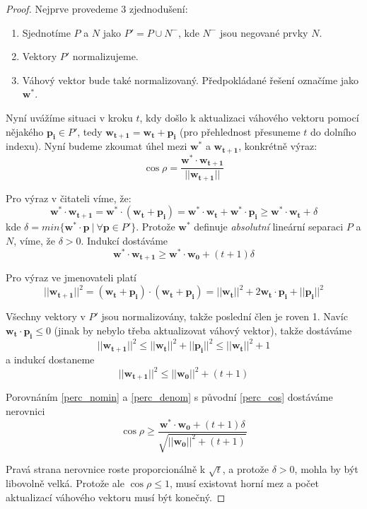 \documentclass[11pt]{report} %
\renewcommand{\vec}[1]{\mathbf{#1}}
\numberwithin{equation}{section}
\begin{document}
\begin{proof}
Nejprve provedeme 3 zjednodušení:
\begin{enumerate}
	
	
	\item Sjednotíme $P$ a $N$ jako $P' = P \cup N^-$, kde $N^-$ jsou negované prvky $N$.
	\item Vektory $P'$ normalizujeme.
	\item Váhový vektor bude také normalizovaný. Předpokládané řešení označíme jako $\vec{w^*}$.
\end{enumerate}

Nyní uvážíme situaci v kroku $t$, kdy došlo k aktualizaci váhového vektoru pomocí nějakého $\vec{p_i} \in P'$, tedy $\vec{w_{t+1}} = \vec{w_t} + \vec{p_i}$ (pro přehlednost přesuneme $t$ do dolního indexu). Nyní budeme zkoumat úhel mezi $\vec{w^*}$ a $\vec{w_{t+1}}$, konkrétně výraz:
\begin{equation}
\label{perc_cos}
\cos{\rho} = \frac{\vec{w^*} \cdot \vec{w_{t+1}}}{||\vec{w_{t+1}}||}
\end{equation}

Pro výraz v čitateli víme, že:
$$\vec{w^*}\cdot\vec{w_{t+1}} = \vec{w^*}\cdot(\vec{w_{t}} + \vec{p_i}) = \vec{w^*}\cdot\vec{w_{t}} + \vec{w^*}\cdot\vec{p_i} \geq \vec{w^*}\cdot\vec{w_{t}} + \delta$$ 
kde $\delta = min\{\vec{w^*}\cdot\vec{p}\ |\ \forall\vec{p} \in P'\}$. Protože $\vec{w^*}$ definuje \textit{absolutní} lineární separaci $P$ a $N$, víme, že $\delta > 0$. Indukcí dostáváme
\begin{equation}
	\label{perc_nomin}
	\vec{w^*}\cdot\vec{w_{t+1}} \geq \vec{w^*}\cdot\vec{w_0} + (t+1)\delta
\end{equation}

Pro výraz ve jmenovateli platí
$$||\vec{w_{t+1}}||^2 
= (\vec{w_{t}} + \vec{p_i}) \cdot (\vec{w_{t}} + \vec{p_i}) 
= ||\vec{w_t}||^2 + 2\vec{w_t}\cdot\vec{p_i} + ||\vec{p_i}||^2
$$

Všechny vektory v $P'$ jsou normalizovány, takže poslední člen je roven 1. Navíc $\vec{w_t}\cdot\vec{p_i} \leq 0$ (jinak by nebylo třeba aktualizovat váhový vektor), takže dostáváme
$$
||\vec{w_{t+1}}||^2 \leq ||\vec{w_t}||^2 + ||\vec{p_i}||^2 \leq ||\vec{w_t}||^2 + 1
$$
a indukcí dostaneme
\begin{equation}
\label{perc_denom}
||\vec{w_{t+1}}||^2 \leq ||\vec{w_0}||^2 + (t+1)
\end{equation}

Porovnáním \ref{perc_nomin} a \ref{perc_denom} s původní \ref{perc_cos} dostáváme nerovnici
$$
\cos\rho \geq \frac{\vec{w^*}\cdot\vec{w_0} + (t+1)\delta}{\sqrt{||\vec{w_0}||^2 + (t+1)}}
$$

Pravá strana nerovnice roste proporcionálně k $\sqrt{t}$, a protože $\delta > 0$, mohla by být libovolně velká. Protože ale $\cos\rho \leq 1$, musí existovat horní mez a počet aktualizací váhového vektoru musí být konečný.

\end{proof}
\end{document}
